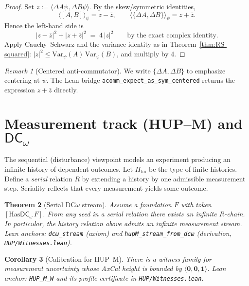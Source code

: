 \documentclass[11pt]{article}
\newcommand{\DCw}{\mathsf{DC}_{\omega}}
\newcommand{\hzero}{\mathbf{0}}
\newcommand{\hone}{\mathbf{1}}
\newcommand{\DCwonly}{\langle \hzero,\hzero,\hone\rangle}
\newcommand{\lean}[1]{\texttt{#1}}
\newcommand{\leanok}{\text{\tiny [✓ Lean Verified]}}
\newcommand{\ip}[2]{\langle #1, #2 \rangle}
\newcommand{\E}[1]{\langle #1 \rangle}
\newcommand{\comm}[2]{[#1, #2]}
\newcommand{\acomm}[2]{\{#1, #2\}} %
\newcommand{\absC}[1]{\left| #1 \right|}
\newcommand{\abssq}[1]{\absC{#1}^{2}}
\newcommand{\Var}{\mathrm{Var}}
\theoremstyle{plain}
\newtheorem{theorem}{Theorem}[section]
\newtheorem{corollary}[theorem]{Corollary}
\theoremstyle{definition}
\theoremstyle{remark}
\newtheorem{remark}[theorem]{Remark}
\begin{document}
\begin{proof}
Set $z:=\ip{\Delta A\psi}{\Delta B\psi}$.
By the skew/symmetric identities,
\[
  \E{\comm{A}{B}}_\psi = z-\bar z, 
  \qquad
  \E{\acomm{\Delta A}{\Delta B}}_\psi = z+\bar z.
\]
Hence the left-hand side is
\[
  \abssq{z-\bar z} + \abssq{z+\bar z}
  \;=\; 4\,\abssq{z}
  \qquad\text{by the exact complex identity.}
\]
Apply Cauchy--Schwarz and the variance identity as in Theorem~\ref{thm:RS-squared}:
$\abssq{z}\le \Var_\psi(A)\,\Var_\psi(B)$, and multiply by $4$.
\end{proof}

\begin{remark}[Centered anti-commutator]
We write $\acomm{\Delta A}{\Delta B}$ to emphasize centering at $\psi$.
The Lean bridge \lean{acomm\_expect\_as\_sym\_centered} returns the expression $z+\bar z$ directly.
\end{remark}

\section{Measurement track (HUP--M) and $\DCw$}
\label{sec:measurement-DC}

The sequential (disturbance) viewpoint models an experiment producing an infinite history of dependent outcomes.
Let $H_{\mathrm{fin}}$ be the type of finite histories. Define a \emph{serial} relation $R$ by extending a history by one admissible measurement step. Seriality reflects that every measurement yields some outcome.

\begin{theorem}[Serial DC$\omega$ stream]\leanok
\label{thm:dcomega}
Assume a foundation $F$ with token $[\mathrm{Has}\DCw\,F]$.
From any seed in a serial relation there exists an infinite $R$-chain. In particular, the history relation above admits an infinite measurement stream.
\emph{Lean anchors:} \lean{dcω\_stream} (axiom) and \lean{hupM\_stream\_from\_dcω} (derivation, \texttt{HUP/Witnesses.lean}).
\end{theorem}

\begin{corollary}[Calibration for HUP--M]\leanok
\label{cor:HUPM}
There is a witness family for measurement uncertainty whose AxCal height is bounded by $\DCwonly$.
\emph{Lean anchor:} \lean{HUP\_M\_W} and its profile certificate in \texttt{HUP/Witnesses.lean}.
\end{corollary}
\end{document}
